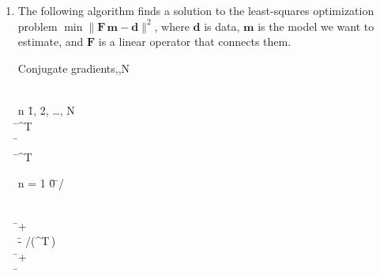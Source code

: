 \begin{enumerate}

\item The following algorithm finds a solution to
  the least-squares optimization problem $\min
  \|\mathbf{F}\,\mathbf{m} - \mathbf{d}\|^2$, where $\mathbf{d}$ is
  data, $\mathbf{m}$ is the model we want to estimate, and
  $\mathbf{F}$ is a linear operator that connects them.

\newpage

 \begin{algorithm}{Conjugate gradients}{,,N}
   \\
   \\
  \begin{FOR}{n \= 1, 2, \ldots, N} \\
     \= ^T\, \\
     \= \, \\
    \rho \= ^T\, \\
    \begin{IF}{n = 1} 
      \beta \= 0 
      \ELSE 
      \beta \= \rho/\hat{\rho} 
    \end{IF} \\
     \= 
     + \beta\,
     \\
    \alpha \= - \rho/(^T\,) \\
     \= 
     + \alpha\,
     \\
    \hat{\rho} \= \rho
  \end{FOR} \\        
  \RETURN {}
\end{algorithm}


\end{enumerate}
